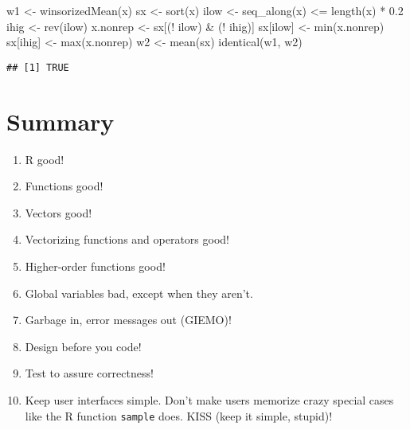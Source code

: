 \documentclass[
]{article}
\newenvironment{Shaded}{\begin{snugshade}}{\end{snugshade}}
\newcommand{\FloatTok}[1]{\textcolor[rgb]{0.00,0.00,0.81}{#1}}
\newcommand{\FunctionTok}[1]{\textcolor[rgb]{0.00,0.00,0.00}{#1}}
\newcommand{\NormalTok}[1]{#1}
\newcommand{\OtherTok}[1]{\textcolor[rgb]{0.56,0.35,0.01}{#1}}
\newcommand{\SpecialCharTok}[1]{\textcolor[rgb]{0.00,0.00,0.00}{#1}}
\providecommand{\tightlist}{%
  \setlength{\itemsep}{0pt}\setlength{\parskip}{0pt}}
\begin{document}
\begin{Shaded}
\begin{Highlighting}[]
\NormalTok{w1 }\OtherTok{\textless{}{-}} \FunctionTok{winsorizedMean}\NormalTok{(x)}
\NormalTok{sx }\OtherTok{\textless{}{-}} \FunctionTok{sort}\NormalTok{(x)}
\NormalTok{ilow }\OtherTok{\textless{}{-}} \FunctionTok{seq\_along}\NormalTok{(x) }\SpecialCharTok{\textless{}=} \FunctionTok{length}\NormalTok{(x) }\SpecialCharTok{*} \FloatTok{0.2}
\NormalTok{ihig }\OtherTok{\textless{}{-}} \FunctionTok{rev}\NormalTok{(ilow)}
\NormalTok{x.nonrep }\OtherTok{\textless{}{-}}\NormalTok{ sx[(}\SpecialCharTok{!}\NormalTok{ ilow) }\SpecialCharTok{\&}\NormalTok{ (}\SpecialCharTok{!}\NormalTok{ ihig)]}
\NormalTok{sx[ilow] }\OtherTok{\textless{}{-}} \FunctionTok{min}\NormalTok{(x.nonrep)}
\NormalTok{sx[ihig] }\OtherTok{\textless{}{-}} \FunctionTok{max}\NormalTok{(x.nonrep)}
\NormalTok{w2 }\OtherTok{\textless{}{-}} \FunctionTok{mean}\NormalTok{(sx)}
\FunctionTok{identical}\NormalTok{(w1, w2)}
\end{Highlighting}
\end{Shaded}

\begin{verbatim}
## [1] TRUE
\end{verbatim}

\hypertarget{summary}{%
\section{Summary}\label{summary}}

\begin{enumerate}
\def\labelenumi{\arabic{enumi}.}
\tightlist
\item
  R good!
\item
  Functions good!
\item
  Vectors good!
\item
  Vectorizing functions and operators good!
\item
  Higher-order functions good!
\item
  Global variables bad, except when they aren't.
\item
  Garbage in, error messages out (GIEMO)!
\item
  Design before you code!
\item
  Test to assure correctness!
\item
  Keep user interfaces simple. Don't make users memorize crazy special
  cases like the R function \texttt{sample} does. KISS (keep it simple,
  stupid)!
\end{enumerate}
\end{document}
